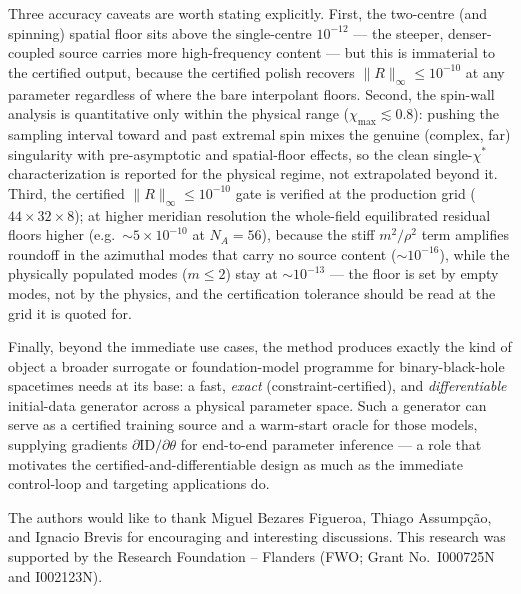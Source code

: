 \documentclass[
  aps,
  prd,
  twocolumn,
  amsmath,
  amssymb,
  nofootinbib,
  superscriptaddress,
  floatfix,
]{revtex4-2}
\newcommand{\dID}{\partial \mathrm{ID}/\partial\theta}
\begin{document}
Three accuracy caveats are worth stating explicitly. First, the two-centre (and
spinning) spatial floor sits above the single-centre $10^{-12}$ --- the steeper,
denser-coupled source carries more high-frequency content --- but this is
immaterial to the certified output, because the certified polish recovers
$\|R\|_\infty\le10^{-10}$ at any parameter regardless of where the bare interpolant
floors. Second, the spin-wall analysis is quantitative only within the physical
range ($\chi_{\max}\lesssim0.8$): pushing the sampling interval toward and past
extremal spin mixes the genuine (complex, far) singularity with pre-asymptotic and
spatial-floor effects, so the clean single-$\chi^\ast$ characterization is reported
for the physical regime, not extrapolated beyond it. Third, the certified
$\|R\|_\infty\le10^{-10}$ gate is verified at the production grid
($44\times32\times8$); at higher meridian resolution the whole-field equilibrated
residual floors higher (e.g.\ $\sim\!5\times10^{-10}$ at $N_A=56$), because the
stiff $m^2/\rho^2$ term amplifies roundoff in the azimuthal modes that carry no
source content ($\sim\!10^{-16}$), while the physically populated modes
($m\le2$) stay at $\sim\!10^{-13}$ --- the floor is set by empty modes, not by
the physics, and the certification tolerance should be read at the grid it is
quoted for.

Finally, beyond the immediate use cases, the method produces exactly the kind of
object a broader surrogate or foundation-model programme for binary-black-hole
spacetimes needs at its base: a fast, \emph{exact} (constraint-certified), and
\emph{differentiable} initial-data generator across a physical parameter space.
Such a generator can serve as a certified training source and a warm-start oracle
for those models, supplying gradients $\dID$ for end-to-end parameter inference ---
a role that motivates the certified-and-differentiable design as much as the
immediate control-loop and targeting applications do.

\begin{acknowledgments}
The authors would like to thank Miguel Bezares Figueroa, Thiago Assump\c{c}\~ao, and Ignacio Brevis for encouraging and interesting discussions.
This research was supported by the Research Foundation -- Flanders (FWO; Grant No.\ I000725N and I002123N).
\end{acknowledgments}

\appendix


\end{document}
